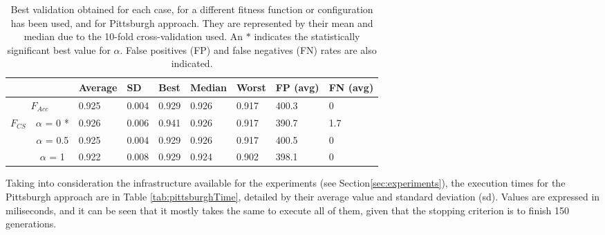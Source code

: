 \documentclass[a4paper,10pt,twocolumn,preprint,3p]{elsarticle}
\begin{document}
\begin{table*}
\begin{center}
\begin{tabular}{cc|l|l|l|l|l|l|l|}
\cline{3-9}
                                                &                & Average & SD & Best       & Median & Worst & FP (avg) & FN (avg)   \\ \hline
\multicolumn{2}{|c|}{$F_{Acc}$}                                  & 0.925 & 0.004 & 0.929      & 0.926  & 0.917 & 400.3 & 0 \\ \hline
\multicolumn{1}{|c|}{\multirow{3}{*}{$F_{CS}$}} & $\alpha$ = 0 *  & 0.926 & 0.006 & 0.941     & 0.926   & 0.917 & 390.7 & 1.7 \\ \cline{2-9} 
\multicolumn{1}{|c|}{}                          & $\alpha$ = 0.5 & 0.925 & 0.004 & 0.929       & 0.926   & 0.917 & 400.5 & 0 \\ \cline{2-9} 
\multicolumn{1}{|c|}{}                          & $\alpha$ = 1   & 0.922  & 0.008 & 0.929       & 0.924 & 0.902 & 398.1 & 0 \\ \hline
\end{tabular}
\caption{Best validation obtained for each case, for a different fitness function or configuration has been used, and for Pittsburgh approach. They are represented by their mean and median due to the 10-fold cross-validation used. An $*$ indicates the  statistically significant best value for $\alpha$. False positives (FP) and false negatives (FN) rates are also indicated.}
\label{tab:pittsburghVAL}
\end{center}
\end{table*}

Taking into consideration the infrastructure available for the experiments (see Section\ref{sec:experiments}), the execution times for the Pittsburgh approach are in Table \ref{tab:pittsburghTime}, detailed by their average value and standard deviation (sd). Values are expressed in miliseconds, and it can be seen that it mostly takes the same to execute all of them, given that the stopping criterion is to finish 150 generations.
\end{document}
